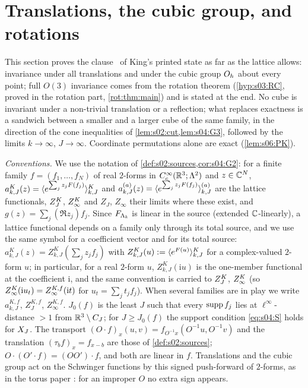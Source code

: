 \section{Translations, the cubic group, and rotations}

This section proves the clause \OSo\ of King's printed state as far as the lattice allows: invariance under all translations and under the cubic group $O_h$ about every point; full $O(3)$ invariance comes from the rotation theorem (\cref{hyp:s03:RC}, proved in the rotation part, \cref{rot:thm:main}) and is stated at the end. No cube is invariant under a non-trivial translation or a reflection; what replaces exactness is a sandwich between a smaller and a larger cube of the same family, in the direction of the cone inequalities of \cref{lem:s02:cut,lem:s04:G3}, followed by the limits $k\to\infty$, $J\to\infty$. Coordinate permutations alone are exact (\cref{lem:s06:PK}).

\emph{Conventions.} We use the notation of \cref{def:s02:sources,cor:s04:G2}: for a finite family $f=(f_1,\dots,f_N)$ of real $2$-forms in $C^\infty_c(\mathbb R^3;\Lambda^2)$ and $z\in\mathbb C^N$, $a^K_{k,J}(z)=\langle e^{\sum_jz_jF(f_j)}\rangle^{K}_{k,J}$ and $a^{(a)}_{k,J}(z)=\langle e^{\sum_jz_jF(f_j)}\rangle^{(a)}_{k,J}$ are the lattice functionals, $Z^{K}_{J}$, $Z^{K}_{\infty}$ and $Z_J$, $Z_\infty$ their limits where these exist, and $g(z)=\sum_j(\Re z_j)f_j$. Since $F_{\Lambda_k}$ is linear in the source (extended $\mathbb C$-linearly), a lattice functional depends on a family only through its total source, and we use the same symbol for a coefficient vector and for its total source: $a^K_{k,J}(z)=Z^K_{k,J}(\sum_jz_jf_j)$ with $Z^K_{k,J}(u):=\langle e^{F(u)}\rangle^{K}_{k,J}$ for a complex-valued $2$-form $u$; in particular, for a real $2$-form $u$, $Z^K_{k,J}(\mathrm iu)$ is the one-member functional at the coefficient $\mathrm i$, and the same convention is carried to $Z^{K}_{J}$, $Z^{K}_{\infty}$ (so $Z^{K}_{\infty}(\mathrm iu_t)=Z^{K,f}_\infty(\mathrm it)$ for $u_t=\sum_jt_jf_j$). When several families are in play we write $a^{K,f}_{k,J}$, $Z^{K,f}_J$, $Z^{K,f}_\infty$. $J_0(f)$ is the least $J$ such that every $\operatorname{supp} f_j$ lies at $\ell^\infty$-distance $>1$ from $\mathbb R^3\setminus C_J$; for $J\ge J_0(f)$ the support condition \eqref{eq:s04:S} holds for $X_J$. The transport $(O\cdot f)_x(u,v)=f_{O^{-1}x}(O^{-1}u,O^{-1}v)$ and the translation $(\tau_bf)_x=f_{x-b}$ are those of \cref{def:s02:sources}; $O\cdot(O'\cdot f)=(OO')\cdot f$, and both are linear in $f$. Translations and the cubic group act on the Schwinger functions by this signed push-forward of $2$-forms, as in the torus paper \cite{SymPhase}: for an improper $O$ no extra sign appears.

